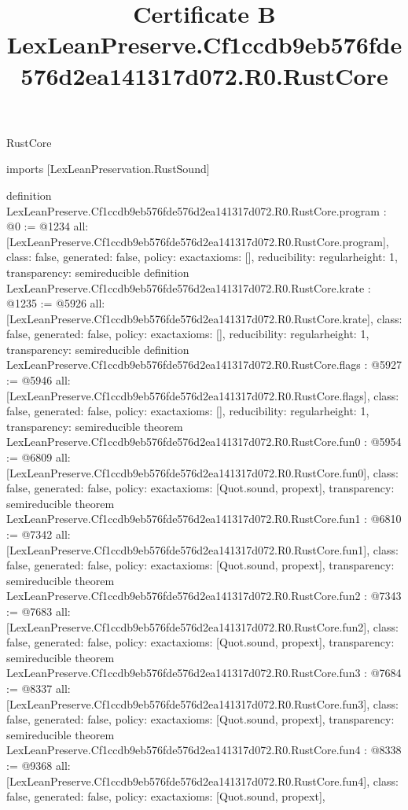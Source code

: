 \begin{lexlean}{RustCore}
\title{Certificate B LexLeanPreserve.Cf1ccdb9eb576fde576d2ea141317d072.R0.RustCore}
\begin{coremodule}
imports [LexLeanPreservation.RustSound]

definition LexLeanPreserve.Cf1ccdb9eb576fde576d2ea141317d072.R0.RustCore.program : @0 := @1234 {
  all: [LexLeanPreserve.Cf1ccdb9eb576fde576d2ea141317d072.R0.RustCore.program],
  class: false,
  generated: false,
  policy: exact{axioms: []},
  reducibility: regular{height: 1},
  transparency: semireducible
}
definition LexLeanPreserve.Cf1ccdb9eb576fde576d2ea141317d072.R0.RustCore.krate : @1235 := @5926 {
  all: [LexLeanPreserve.Cf1ccdb9eb576fde576d2ea141317d072.R0.RustCore.krate],
  class: false,
  generated: false,
  policy: exact{axioms: []},
  reducibility: regular{height: 1},
  transparency: semireducible
}
definition LexLeanPreserve.Cf1ccdb9eb576fde576d2ea141317d072.R0.RustCore.flags : @5927 := @5946 {
  all: [LexLeanPreserve.Cf1ccdb9eb576fde576d2ea141317d072.R0.RustCore.flags],
  class: false,
  generated: false,
  policy: exact{axioms: []},
  reducibility: regular{height: 1},
  transparency: semireducible
}
theorem LexLeanPreserve.Cf1ccdb9eb576fde576d2ea141317d072.R0.RustCore.fun0 : @5954 := @6809 {
  all: [LexLeanPreserve.Cf1ccdb9eb576fde576d2ea141317d072.R0.RustCore.fun0],
  class: false,
  generated: false,
  policy: exact{axioms: [Quot.sound, propext]},
  transparency: semireducible
}
theorem LexLeanPreserve.Cf1ccdb9eb576fde576d2ea141317d072.R0.RustCore.fun1 : @6810 := @7342 {
  all: [LexLeanPreserve.Cf1ccdb9eb576fde576d2ea141317d072.R0.RustCore.fun1],
  class: false,
  generated: false,
  policy: exact{axioms: [Quot.sound, propext]},
  transparency: semireducible
}
theorem LexLeanPreserve.Cf1ccdb9eb576fde576d2ea141317d072.R0.RustCore.fun2 : @7343 := @7683 {
  all: [LexLeanPreserve.Cf1ccdb9eb576fde576d2ea141317d072.R0.RustCore.fun2],
  class: false,
  generated: false,
  policy: exact{axioms: [Quot.sound, propext]},
  transparency: semireducible
}
theorem LexLeanPreserve.Cf1ccdb9eb576fde576d2ea141317d072.R0.RustCore.fun3 : @7684 := @8337 {
  all: [LexLeanPreserve.Cf1ccdb9eb576fde576d2ea141317d072.R0.RustCore.fun3],
  class: false,
  generated: false,
  policy: exact{axioms: [Quot.sound, propext]},
  transparency: semireducible
}
theorem LexLeanPreserve.Cf1ccdb9eb576fde576d2ea141317d072.R0.RustCore.fun4 : @8338 := @9368 {
  all: [LexLeanPreserve.Cf1ccdb9eb576fde576d2ea141317d072.R0.RustCore.fun4],
  class: false,
  generated: false,
  policy: exact{axioms: [Quot.sound, propext]},
}
\end{coremodule}
\end{lexlean}
